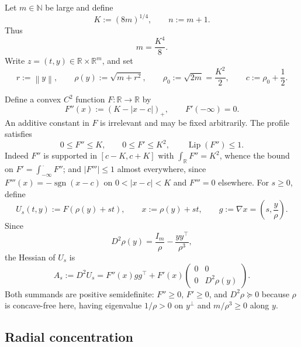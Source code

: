 \documentclass[11pt]{article}
\theoremstyle{plain}
\theoremstyle{definition}
\theoremstyle{remark}
\newcommand{\R}{\mathbb{R}}
\newcommand{\Lip}{\operatorname{Lip}}
\newcommand{\Id}{I}
\newcommand{\1}{\mathbf{1}}
\newcommand{\norm}[1]{\left\lVert #1\right\rVert}
\newcommand{\abs}[1]{\left\lvert #1\right\rvert}
\begin{document}
Let $m\in\mathbb N$ be large and define
\begin{equation}
    K:=(8m)^{1/4},
    \qquad
    n:=m+1.
    \label{eq:K-m}
\end{equation}
Thus
\[
    m=\frac{K^4}{8}.
\]
Write $z=(t,y)\in\R\times\R^m$, and set
\begin{equation}
    r:=\norm y,
    \qquad
    \rho(y):=\sqrt{m+r^2},
    \qquad
    \rho_0:=\sqrt{2m}=\frac{K^2}{2},
    \qquad
    c:=\rho_0+\frac12.
    \label{eq:rho-def}
\end{equation}

Define a convex $C^2$ function $F:\R\to\R$ by
\begin{equation}
    F''(x):=(K-\abs{x-c})_+,
    \qquad
    F'(-\infty)=0.
    \label{eq:F-def}
\end{equation}
An additive constant in $F$ is irrelevant and may be fixed arbitrarily. The
profile satisfies
\begin{equation}
    0\leq F''\leq K,
    \qquad
    0\leq F'\leq K^2,
    \qquad
    \Lip(F'')\leq1.
    \label{eq:F-basic}
\end{equation}
Indeed $F''$ is supported in $[c-K,c+K]$ with $\int_\R F''=K^2$, whence the
bound on $F'=\int_{-\infty}^{\,\cdot}F''$; and $\abs{F'''}\leq1$ almost
everywhere, since $F'''(x)=-\operatorname{sgn}(x-c)$ on
$0<\abs{x-c}<K$ and $F'''=0$ elsewhere. For $s\geq0$, define
\begin{equation}
    U_s(t,y):=F(\rho(y)+st),
    \qquad
    x:=\rho(y)+st,
    \qquad
    g:=\nabla x=\left(s,\frac{y}{\rho}\right).
    \label{eq:Us-def}
\end{equation}
Since
\[
    D^2\rho(y)
    =
    \frac{\Id_m}{\rho}
    -
    \frac{yy^\top}{\rho^3},
\]
the Hessian of $U_s$ is
\begin{equation}
    A_s:=D^2U_s
    =
    F''(x)gg^\top
    +
    F'(x)
    \begin{pmatrix}
        0&0\\
        0&D^2\rho(y)
    \end{pmatrix}.
    \label{eq:As}
\end{equation}
Both summands are positive semidefinite: $F''\geq0$, $F'\geq0$, and
$D^2\rho\succeq0$ because $\rho$ is concave-free here, having eigenvalue
$1/\rho>0$ on $y^\perp$ and $m/\rho^3\geq0$ along $y$.

\subsection{Radial concentration}
\end{document}
